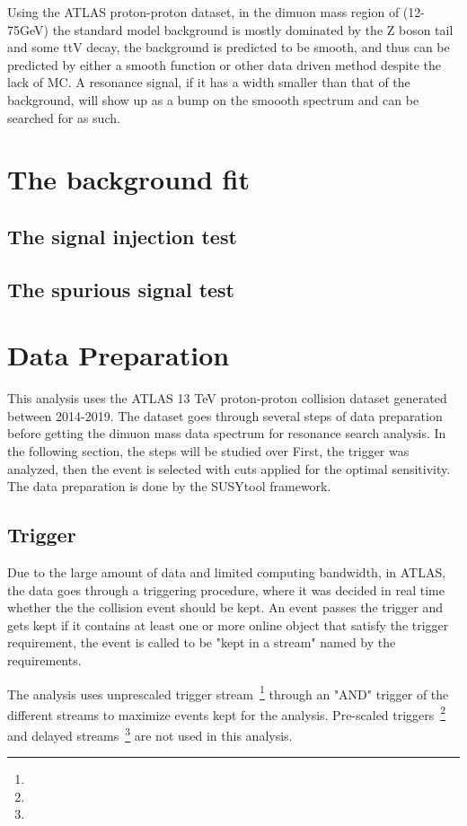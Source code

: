 Using the ATLAS proton-proton dataset, in the dimuon mass region of (12-75GeV) the standard model background is mostly dominated by the Z boson tail and some ttV decay, the background is predicted to be smooth, and thus can be predicted by either a smooth function or other data driven method despite the lack of MC. A resonance signal, if it has a width smaller than that of the background, will show up as a bump on the smoooth spectrum and can be searched for as such.

\section{The background fit}

\subsection{The signal injection test}

\subsection{The spurious signal test}

\section{Data Preparation}
This analysis uses the ATLAS 13 TeV proton-proton collision dataset generated between 2014-2019. The dataset goes through several steps of data preparation before getting the dimuon mass data spectrum for resonance search analysis. 
In the following section, the steps will be studied over
First, the trigger was analyzed, then the event is selected with cuts applied for the optimal sensitivity. 
The data preparation is done by the SUSYtool framework. 

\subsection{Trigger}
Due to the large amount of data and limited computing bandwidth, in ATLAS, the data goes through a triggering procedure, where it was decided in real time whether the the collision event should be kept. An event passes the trigger and gets kept if it contains at least one or more online object that satisfy the trigger requirement, the event is called to be "kept in a stream" named by the requirements.

The analysis uses unprescaled trigger stream~\footnote{} through an "AND" trigger of the different streams to maximize events kept for the analysis. Pre-scaled triggers~\footnote{} and delayed streams~\footnote{} are not used in this analysis. 

